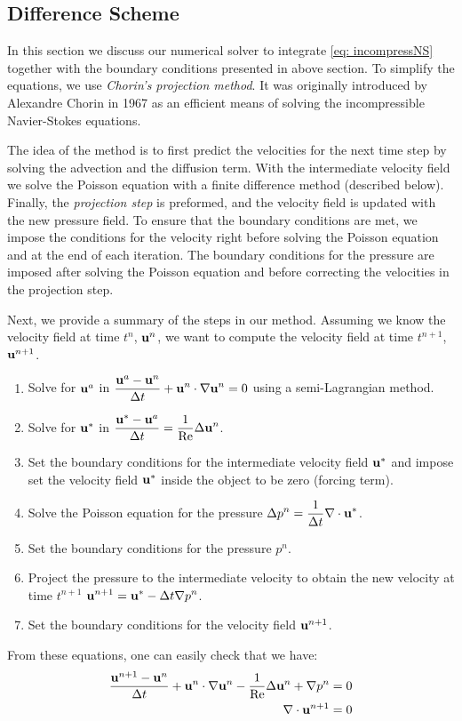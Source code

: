 \subsection{Difference Scheme} \label{sec: diffScheme}
In this section we discuss our numerical solver to integrate \cref{eq: incompressNS} together with the boundary conditions presented in above section. To simplify the equations, we use \textit{Chorin's projection method}. It was originally introduced by Alexandre Chorin in 1967 \cite{Chorin1967NumericalNS} as an efficient means of solving the incompressible Navier-Stokes equations.

The idea of the method is to first predict the velocities for the next time step by solving the advection and the diffusion term. With the intermediate velocity field we solve the Poisson equation with a finite difference method (described below). Finally, the \textit{projection step} is preformed, and the velocity field is updated with the new pressure field.
To ensure that the boundary conditions are met, we impose the conditions for the velocity right before solving the Poisson equation and at the end of each iteration. The boundary conditions for the pressure are imposed after solving the Poisson equation and before correcting the velocities in the projection step.

Next, we provide a summary of the steps in our method. Assuming we know the velocity field at time $t^n$, $\boldsymbol{\mathrm{u}}^n$, we want to compute the velocity field at time $t^{n+1}$, $\boldsymbol{\mathrm{u}}^{n+1}$.
\begin{enumerate}
  \item Solve for $\boldsymbol{\mathrm{u}}^a$ in $\displaystyle  \frac{\boldsymbol{\mathrm{u}}^a-\boldsymbol{\mathrm{u}}^n}{\Delta t} + \boldsymbol{\mathrm{u}}^n \cdot \nabla \boldsymbol{\mathrm{u}}^n = 0$ using a semi-Lagrangian method.
  \item Solve for $\boldsymbol{\mathrm{u}}^*$ in $\displaystyle  \frac{\boldsymbol{\mathrm{u}}^* - \boldsymbol{\mathrm{u}}^a}{\Delta t} = \frac{1}{\mathrm{Re}} \Delta \boldsymbol{\mathrm{u}}^n$.
  \item Set the boundary conditions for the intermediate velocity field $\boldsymbol{\mathrm{u}}^*$ and impose set the velocity field $\boldsymbol{\mathrm{u}}^*$ inside the object to be zero (forcing term).
  \item Solve the Poisson equation for the pressure $\displaystyle \Delta p^{n} = \frac{1}{\Delta t}\nabla \cdot \boldsymbol{\mathrm{u}}^*$.
  \item Set the boundary conditions for the pressure $p^{n}$.
  \item Project the pressure to the intermediate velocity to obtain the new velocity at time $t^{n+1}$ $\displaystyle \boldsymbol{\mathrm{u}}^{n+1} = \boldsymbol{\mathrm{u}}^* - \Delta t\nabla p^{n}$.
  \item Set the boundary conditions for the velocity field $\boldsymbol{\mathrm{u}}^{n+1}$.
\end{enumerate}
From these equations, one can easily check that we have:
\begin{align*}
  \frac{\boldsymbol{\mathrm{u}}^{n+1}-\boldsymbol{\mathrm{u}}^n}{\Delta t} + \boldsymbol{\mathrm{u}}^n \cdot \nabla \boldsymbol{\mathrm{u}}^n - \frac{1}{\mathrm{Re}} \Delta \boldsymbol{\mathrm{u}}^n + \nabla p^{n} & = 0 \\
  \nabla \cdot \boldsymbol{\mathrm{u}}^{n+1}                                                                                                   & = 0
\end{align*}

